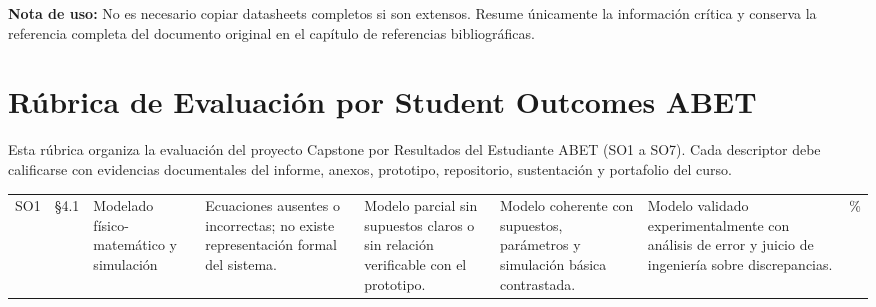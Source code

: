 \documentclass[12pt,letterpaper]{report}
\begin{document}
\begin{instrucciones}
\noindent \textbf{Nota de uso:} No es necesario copiar datasheets completos si son extensos. Resume únicamente la información crítica y conserva la referencia completa del documento original en el capítulo de referencias bibliográficas.
\end{instrucciones}


\chapter{Rúbrica de Evaluación por Student Outcomes ABET}

\begin{instrucciones}
Esta rúbrica organiza la evaluación del proyecto Capstone por Resultados del Estudiante ABET (SO1 a SO7). Cada descriptor debe calificarse con evidencias documentales del informe, anexos, prototipo, repositorio, sustentación y portafolio del curso.
\end{instrucciones}

\newcommand{\rubricaSO}[8]{%
\begin{tablaCentrada}
\begingroup
\tiny
\setlength{\tabcolsep}{2pt}
\renewcommand{\arraystretch}{1.15}
\begin{tabularx}{\textwidth}{>{\scriptsize\centering\arraybackslash}p{0.05\textwidth}>{\scriptsize\RaggedRight\arraybackslash}p{0.12\textwidth}>{\scriptsize\RaggedRight\arraybackslash}p{0.14\textwidth}>{\scriptsize\RaggedRight\arraybackslash}X>{\scriptsize\RaggedRight\arraybackslash}X>{\scriptsize\RaggedRight\arraybackslash}X>{\scriptsize\RaggedRight\arraybackslash}X>{\scriptsize\centering\arraybackslash}p{0.06\textwidth}}
\toprule
  \tablaEncabezado
  \tablaHeader{SO} & \tablaHeader{Sección evaluada} & \tablaHeader{Criterio de desempeño} & \tablaHeader{Insatisfactorio (0--59)} & \tablaHeader{En desarrollo (60--74)} & \tablaHeader{Desarrollado (75--89)} & \tablaHeader{Ejemplar (90--100)} & \tablaHeader{Peso} \\
\midrule
  #1 & #2 & #3 & #4 & #5 & #6 & #7 & #8 \\
\bottomrule
\end{tabularx}
\endgroup
\end{tablaCentrada}%
}

\rubricaSO{SO1}{\S4.1}{Modelado físico-matemático y simulación}{Ecuaciones ausentes o incorrectas; no existe representación formal del sistema.}{Modelo parcial sin supuestos claros o sin relación verificable con el prototipo.}{Modelo coherente con supuestos, parámetros y simulación básica contrastada.}{Modelo validado experimentalmente con análisis de error y juicio de ingeniería sobre discrepancias.}{15\%}
\end{document}
